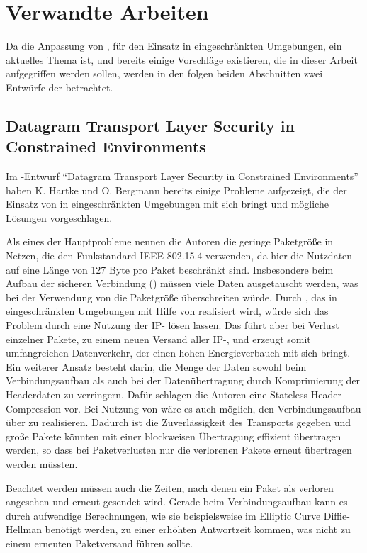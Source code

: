 \section{Verwandte Arbeiten}

Da die Anpassung von , für den Einsatz in eingeschränkten Umgebungen, ein aktuelles Thema ist, und bereits einige Vorschläge
existieren, die in dieser Arbeit aufgegriffen werden sollen, werden in den folgen beiden Abschnitten zwei Entwürfe der  betrachtet.

\subsection{Datagram Transport Layer Security in Constrained Environments}
Im -Entwurf "`Datagram Transport Layer Security in Constrained Environments"' \cite{draftcodtls} haben K. Hartke und O. Bergmann
bereits einige Probleme aufgezeigt, die der Einsatz von  in eingeschränkten Umgebungen mit sich bringt und mögliche Lösungen vorgeschlagen.

Als eines der Hauptprobleme nennen die Autoren die geringe Paketgröße in Netzen, die den Funkstandard IEEE 802.15.4 \cite{ieee802154} verwenden,
da hier die Nutzdaten auf eine Länge von 127 Byte pro Paket beschränkt sind. Insbesondere beim Aufbau der sicheren Verbindung () müssen
viele Daten ausgetauscht werden, was bei der Verwendung von  die Paketgröße überschreiten würde. Durch  \cite{rfc2460}, das in
eingeschränkten Umgebungen mit Hilfe von  \cite{rfc4944} realisiert wird, würde sich das Problem durch eine Nutzung der IP-
lösen lassen. Das führt aber bei Verlust einzelner Pakete, zu einem neuen Versand aller IP-, und erzeugt somit umfangreichen Datenverkehr,
der einen hohen Energieverbauch mit sich bringt. Ein weiterer Ansatz besteht darin, die Menge der Daten sowohl beim Verbindungsaufbau als auch bei der
Datenübertragung durch Komprimierung der Headerdaten zu verringern. Dafür schlagen die Autoren eine Stateless Header Compression vor. Bei Nutzung von
 wäre es auch möglich, den Verbindungsaufbau über  zu realisieren. Dadurch ist die Zuverlässigkeit des Transports gegeben und große Pakete
könnten mit einer blockweisen Übertragung effizient übertragen werden, so dass bei Paketverlusten nur die verlorenen Pakete erneut übertragen werden müssten.

Beachtet werden müssen auch die Zeiten, nach denen ein Paket als verloren angesehen und erneut gesendet wird. Gerade beim Verbindungsaufbau
kann es durch aufwendige Berechnungen, wie sie beispielsweise im Elliptic Curve Diffie-Hellman benötigt werden, zu einer erhöhten
Antwortzeit kommen, was nicht zu einem erneuten Paketversand führen sollte.


